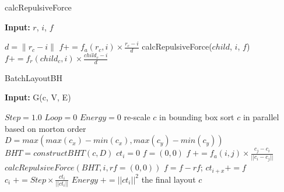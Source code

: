 \documentclass[conference]{article}
\begin{document}
\begin{algorithm}
\caption{calcRepulsiveForce}
\hspace*{\algorithmicindent} \textbf{Input:} $r$, $i$, $f$
\begin{algorithmic}[1]
\State $d = \parallel r_c - i\parallel$ 
 
\State $f += f_a(r_c,i)\times \frac{r_c-i}{d}$ 
\Else 
{}
\State calcRepulsiveForce($child$, $i$, $f$)
\Else
\State $f += f_r(child_c,i)\times \frac{child_c-i}{d}$ 
\EndIf
\EndFor
\EndIf
\end{algorithmic}
\label{algo:queryserve}
\end{algorithm}


\begin{algorithm}
\caption{BatchLayoutBH}
\hspace*{\algorithmicindent} \textbf{Input:} G(c, V, E)
\begin{algorithmic}[1]
\State $Step = 1.0$ 
\State $Loop = 0$
\State $Energy = 0$
\State re-scale $c$ in bounding box
\State sort $c$ in parallel based on morton order
\State $D = max(max(c_x)-min(c_x),max(c_y)-min(c_y))$
\State $BHT = constructBHT(c, D)$ 
			\State $ct_{i} = 0$
\EndParFor
{}
        \State $f = (0,0)$
                    \State $f\;+= f_a(i,j)\times \frac{c_j - c_i}{||c_i - c_j||}$
        \EndFor 
        \State $calcRepulsiveForce(BHT, i, rf = (0,0))$ 
        \State $f = f - rf$;
        \State $ct_{i+x} += f$
    \EndParFor
        \State $c_i\; += Step \times \frac{ct_i}{||ct_i||}$
        \State $Energy\; += ||ct_i||^2$
    \EndParFor
\EndFor
\EndWhile
\newline
\Return the final layout $c$
\end{algorithmic}
\label{algo:cbBatchLayout}
\end{algorithm}
\end{document}
